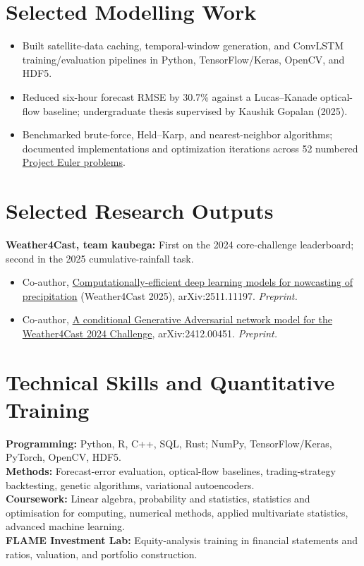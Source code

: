 \section{Selected Modelling Work}
\begin{itemize}
  \item Built satellite-data caching, temporal-window generation, and ConvLSTM training/evaluation pipelines in Python, TensorFlow/Keras, OpenCV, and HDF5.
  \item Reduced six-hour forecast RMSE by 30.7\% against a Lucas--Kanade optical-flow baseline; undergraduate thesis supervised by Kaushik Gopalan (2025).
\end{itemize}
\begin{itemize}
  \item Benchmarked brute-force, Held--Karp, and nearest-neighbor algorithms; documented implementations and optimization iterations across 52 numbered \href{https://github.com/jeetsh4h/ProjectEuler}{Project Euler problems}.
\end{itemize}
\section{Selected Research Outputs}
\textbf{Weather4Cast, team kaubega:} First on the 2024 core-challenge leaderboard; second in the 2025 cumulative-rainfall task.\par
\begin{itemize}
  \item Co-author, \href{https://arxiv.org/abs/2511.11197}{Computationally-efficient deep learning models for nowcasting of precipitation} (Weather4Cast 2025), arXiv:2511.11197. \textit{Preprint.}
  \item Co-author, \href{https://arxiv.org/abs/2412.00451}{A conditional Generative Adversarial network model for the Weather4Cast 2024 Challenge}, arXiv:2412.00451. \textit{Preprint.}
\end{itemize}
\section{Technical Skills and Quantitative Training}
\textbf{Programming:} Python, R, C++, SQL, Rust; NumPy, TensorFlow/Keras, PyTorch, OpenCV, HDF5.\\
\textbf{Methods:} Forecast-error evaluation, optical-flow baselines, trading-strategy backtesting, genetic algorithms, variational autoencoders.\\
\textbf{Coursework:} Linear algebra, probability and statistics, statistics and optimisation for computing, numerical methods, applied multivariate statistics, advanced machine learning.\\
\textbf{FLAME Investment Lab:} Equity-analysis training in financial statements and ratios, valuation, and portfolio construction.

